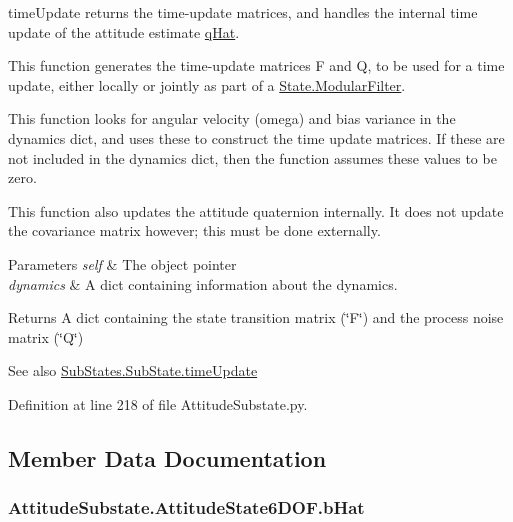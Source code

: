 time\+Update returns the time-\/update matrices, and handles the internal time update of the attitude estimate \hyperlink{classAttitudeSubstate_1_1AttitudeState6DOF_a36a58a47280151dd544762d9a1d5c35d}{q\+Hat}. 

This function generates the time-\/update matrices F and Q, to be used for a time update, either locally or jointly as part of a \hyperlink{classState_1_1ModularFilter}{State.\+Modular\+Filter}.

This function looks for angular velocity (omega) and bias variance in the dynamics dict, and uses these to construct the time update matrices. If these are not included in the dynamics dict, then the function assumes these values to be zero.

This function also updates the attitude quaternion internally. It does not update the covariance matrix however; this must be done externally.


\begin{DoxyParams}{Parameters}
{\em self} & The object pointer \\
\hline
{\em dynamics} & A dict containing information about the dynamics.\\
\hline
\end{DoxyParams}
\begin{DoxyReturn}{Returns}
A dict containing the state transition matrix (\char`\"{}\+F\char`\"{}) and the process noise matrix (\char`\"{}\+Q\char`\"{})
\end{DoxyReturn}
\begin{DoxySeeAlso}{See also}
\hyperlink{classSubStates_1_1SubState_af07ac4d1435fdecff97cff84bae4eeab}{Sub\+States.\+Sub\+State.\+time\+Update} 
\end{DoxySeeAlso}


Definition at line 218 of file Attitude\+Substate.\+py.



\subsection{Member Data Documentation}
\subsubsection[{\texorpdfstring{b\+Hat}{bHat}}]{\setlength{\rightskip}{0pt plus 5cm}Attitude\+Substate.\+Attitude\+State6\+D\+O\+F.\+b\+Hat}\hypertarget{classAttitudeSubstate_1_1AttitudeState6DOF_a1b8eff7c89a7a03875dc04263da7ec18}{}\label{classAttitudeSubstate_1_1AttitudeState6DOF_a1b8eff7c89a7a03875dc04263da7ec18}


